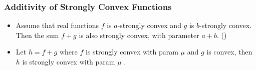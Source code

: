 \subsubsection*{Additivity of Strongly Convex Functions}
\begin{itemize}[leftmargin=*]
    \item Assume that real functions $f$ is $a$-strongly convex and $g$ is $b$-strongly convex. Then the sum $f+g$ is also strongly convex, with parameter $a+b$. () 
    \item Let $h=f+g$ where $f$ is strongly convex with param $\mu$ and $g$ is convex, then $h$ is strongly convex with param $\mu$ .

\end{itemize}








